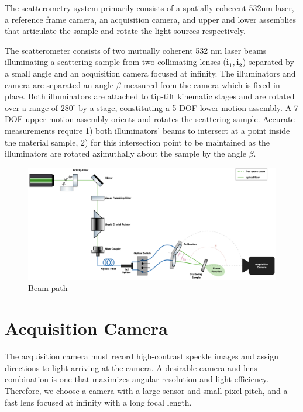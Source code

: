 
The scatterometry system primarily consists of a spatially coherent 532nm laser, a reference frame camera, an acquisition camera, and upper and lower assemblies that articulate the sample and rotate the light sources respectively.

The scatterometer consists of two mutually coherent 532 nm laser beams illuminating a scattering sample from two collimating lenses ($\mathbf{i_1, i_2}$) separated by a small angle and an acquisition camera focused at infinity. The illuminators and camera are separated an angle $\beta$ measured from the camera which is fixed in place. Both illuminators are attached to tip-tilt kinematic stages and are rotated over a range of $280^\circ$ by a stage, constituting a 5 DOF lower motion assembly. A 7 DOF upper motion assembly orients and rotates the scattering sample. Accurate measurements require 1) both illuminators' beams to intersect at a point inside the material sample, 2) for this intersection point to be maintained as the illuminators are rotated azimuthally about the sample by the angle $\beta$.

\begin{figure}
    \centering
    \includegraphics[width=0.75\linewidth]{figures/laser_path.png}
    \caption{Beam path}
    \label{fig:beam_path}
\end{figure}

\section{Acquisition Camera}
The acquisition camera must record high-contrast speckle images and assign directions to light arriving at the camera. A desirable camera and lens combination is one that maximizes angular resolution and light efficiency. Therefore, we choose a camera with a large sensor and small pixel pitch, and a fast lens focused at infinity with a long focal length.


